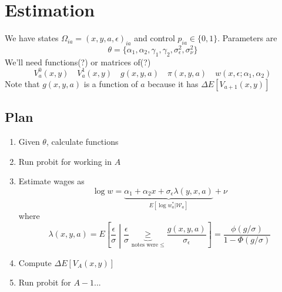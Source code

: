 \documentclass[11pt,letterpaper]{article}
\begin{document}
\section{Estimation}

We have states $\Omega_{ia} = (x,y,a,\epsilon)_{ia}$ and control $p_{ia} \in \{0,1\}$. Parameters are
\[
\theta = \{ \alpha_1, \alpha_2, \gamma_1, \gamma_2, \sigma_\epsilon^2, \sigma^2_\nu \}
\]
We'll need functions(?) or matrices of(?)
\[
V_a^0(x,y) \quad V_a^1(x,y) \quad g(x,y,a) \quad \pi(x,y,a) \quad w(x,\epsilon; \alpha_1, \alpha_2)
\]
Note that $g(x,y,a)$ is a function of $a$ because it has $\Delta E[V_{a+1}(x,y)]$

\subsection{Plan}
\begin{enumerate}
    \item Given $\theta$, calculate functions
    \item Run probit for working in $A$
    \item Estimate wages as 
    \[
        \log w = \underbrace{\alpha_1 + \alpha_2 x + \sigma_\epsilon \lambda(y,x,a)}_{E[\log w_a^* | \mathcal W_a]} + \nu
    \] 
    where
    \[
        \lambda(x,y,a) = E\left[\frac{\epsilon}{\sigma} \middle | \frac{\epsilon}{\sigma} \underbrace{\geq}_{\text{notes were } \leq} \frac{g(x,y,a)}{\sigma_\epsilon}\right]
        = \frac{\phi(g/\sigma)}{1- \Phi(g/\sigma)}
    \]
    \item Compute $\Delta E[V_A(x,y)]$
    \item Run probit for $A-1$...
\end{enumerate}
\end{document}
